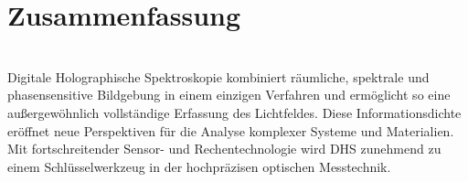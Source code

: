\documentclass[10pt,twocolumn,a4paper]{article}
\begin{document}
\section{Zusammenfassung}
\vspace{-0.3cm}
\hspace{.0cm}
\vspace{0.3cm}
\\
Digitale Holographische Spektroskopie kombiniert räumliche, spektrale und phasensensitive Bildgebung in einem einzigen Verfahren und ermöglicht so eine außergewöhnlich vollständige Erfassung des Lichtfeldes. Diese Informationsdichte eröffnet neue Perspektiven für die Analyse komplexer Systeme und Materialien. Mit fortschreitender Sensor- und Rechentechnologie wird DHS zunehmend zu einem Schlüsselwerkzeug in der hochpräzisen optischen Messtechnik.

\AtNextBibliography{\small}
\printbibliography
\end{document}
